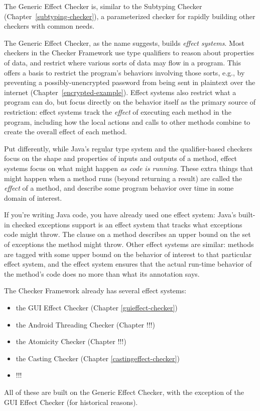 \htmlhr
{}

The Generic Effect Checker is, similar to the Subtyping Checker (Chapter~\ref{subtyping-checker}), a parameterized checker for rapidly building other checkers with common needs.

The Generic Effect Checker, as the name suggests, builds \emph{effect systems}.
Most checkers in the Checker Framework use type qualifiers to reason about properties of data, and restrict where various sorts of data may flow in a program. This offers a basis to restrict the program's behaviors involving those sorts, e.g., by preventing a possibly-unencrypted password from being sent in plaintext over the internet (Chapter~\ref{encrypted-example}).
Effect systems also restrict what a program can do, but focus directly on the behavior itself as the primary source of restriction: effect systems track the \emph{effect} of executing each method in the program, including how the local actions and calls to other methods combine to create the overall effect of each method.

Put differently, while Java's regular type system and the qualifier-based checkers focus on the shape and properties of inputs and outputs of a method, effect systems focus on what might happen \emph{as code is running}. These extra things that might happen when a method runs (beyond returning a result) are called the \emph{effect} of a method, and describe some program behavior over time in some domain of interest.

If you're writing Java code, you have already used one effect system: Java's built-in checked exceptions support is an effect system that tracks what exceptions code might throw.  The  clause on a method describes an upper bound on the set of exceptions the method might throw.  Other effect systems are similar: methods are tagged with some upper bound on the behavior of interest to that particular effect system, and the effect system ensures that the actual run-time behavior of the method's code does no more than what its annotation says.

The Checker Framework already has several effect systems:
\begin{itemize}
    \item the GUI Effect Checker (Chapter \ref{guieffect-checker})
    \item the Android Threading Checker (Chapter !!!)
    \item the Atomicity Checker (Chapter !!!)
    \item the Casting Checker (Chapter \ref{castingeffect-checker})
    \item !!!
\end{itemize}
All of these are built on the Generic Effect Checker, with the exception of the GUI Effect Checker (for historical reasons).

